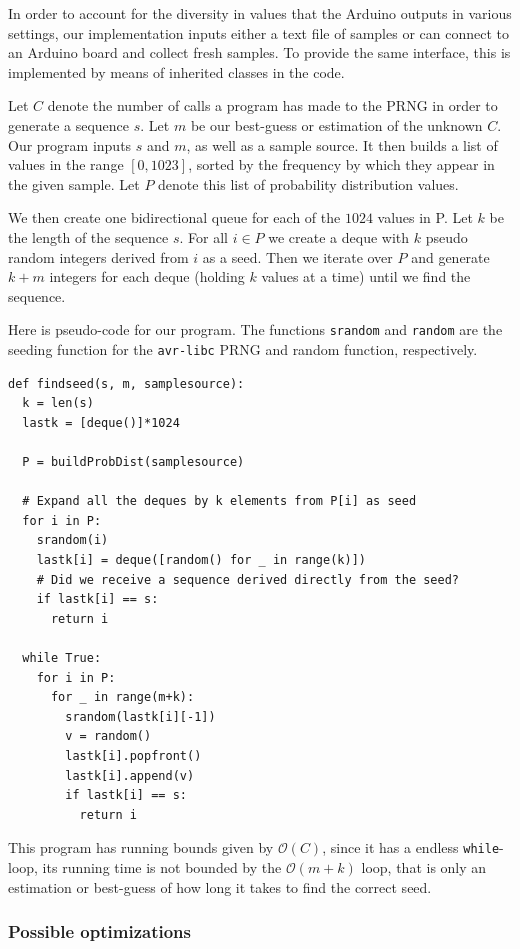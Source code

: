 \documentclass[a4paper]{article}           %
\begin{document}
In order to account for the diversity in values that the Arduino outputs in various settings, our implementation inputs either a text file of samples or can connect to an Arduino board and collect fresh samples. To provide the same interface, this is implemented by means of inherited classes in the code. 

Let $C$ denote the number of calls a program has made to the PRNG in order to generate a sequence $s$. Let $m$ be our best-guess or estimation of the unknown $C$. Our program inputs $s$ and $m$, as well as a sample source. It then builds a list of values in the range $[0, 1023]$, sorted by the frequency by which they appear in the given sample. Let $P$ denote this list of probability distribution values.

We then create one bidirectional queue for each of the $1024$ values in P. Let $k$ be the length of the sequence $s$. For all $i \in P$ we create a deque with $k$ pseudo random integers derived from $i$ as a seed. Then we iterate over $P$ and generate $k+m$ integers for each deque (holding $k$ values at a time) until we find the sequence. 

Here is pseudo-code for our program. The functions \texttt{srandom} and \texttt{random} are the seeding function for the \texttt{avr-libc} PRNG and random function, respectively. 

\begin{lstlisting}[caption=Finding the seed]
def findseed(s, m, samplesource):
  k = len(s)
  lastk = [deque()]*1024

  P = buildProbDist(samplesource)

  # Expand all the deques by k elements from P[i] as seed
  for i in P:
    srandom(i)
    lastk[i] = deque([random() for _ in range(k)])
    # Did we receive a sequence derived directly from the seed?
    if lastk[i] == s:
      return i

  while True:
    for i in P:
      for _ in range(m+k):
        srandom(lastk[i][-1])
        v = random()
        lastk[i].popfront()
        lastk[i].append(v)
        if lastk[i] == s:
          return i
\end{lstlisting}

This program has running bounds given by $\mathcal{O}(C)$, since it has a endless \texttt{while}-loop, its running time is not bounded by the $\mathcal{O}(m+k)$ loop, that is only an estimation or best-guess of how long it takes to find the correct seed. 

\subsubsection{Possible optimizations}
\end{document}
